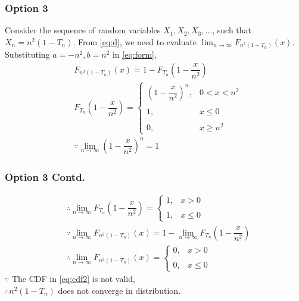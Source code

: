 \documentclass{beamer}
\providecommand{\brak}[1]{\ensuremath{\left(#1\right)}}
\begin{document}
\begin{frame}
\frametitle{Option 3}
Consider the sequence of random variables $X_{1},X_{2},X_{3},\dots$, such that $X_{n}=n^{2}(1-T_{n})$. From \eqref{eq:d}, we need to evaluate $\displaystyle\lim_{n\to\infty}F_{n^{2}(1-T_{n})}(x)$. Substituting $a=-n^{2},b=n^{2}$ in \eqref{eq:form},
\begin{align}
    &F_{n^{2}(1-T_{n})}(x)=1-F_{T_{n}}\brak{1-\dfrac{x}{n^{2}}}\\
    &F_{T_{n}}\brak{1-\dfrac{x}{n^{2}}}=\begin{cases}
	\brak{1-\dfrac{x}{n^{2}}}^{n}, & 0< x<n^{2} \\~\\[-1em]
	1, & x\leq 0\\~\\[-1em]
	0, & x\geq n^{2}
	\end{cases} \\
    &\because\displaystyle\lim_{n\to\infty}\brak{1-\dfrac{x}{n^{2}}}^{n}=1
\end{align}
\end{frame}

\begin{frame}
\frametitle{Option 3 Contd.}
\begin{align}
&\therefore\displaystyle\lim_{n\to\infty} F_{T_{n}}\brak{1-\dfrac{x}{n^{2}}}=\begin{cases}
	1, & x>0 \\~\\[-1em]
	1, & x\leq 0
	\end{cases} \\
&\because\displaystyle\lim_{n\to\infty}F_{n^{2}(1-T_{n})}(x)=1-\displaystyle\lim_{n\to\infty} F_{T_{n}}\brak{1-\dfrac{x}{n^{2}}}\\
\label{eq:cdf2}
    &\therefore\displaystyle\lim_{n\to\infty} F_{n^{2}(1-T_{n})}(x)=\begin{cases}
	0, & x>0 \\~\\[-1em]
	0, & x\leq 0
	\end{cases} 
\end{align}
$\because$ The CDF in \eqref{eq:cdf2} is not valid,\\
$\therefore n^{2}(1-T_{n})$ does not converge in distribution.
\end{frame}
\end{document}
